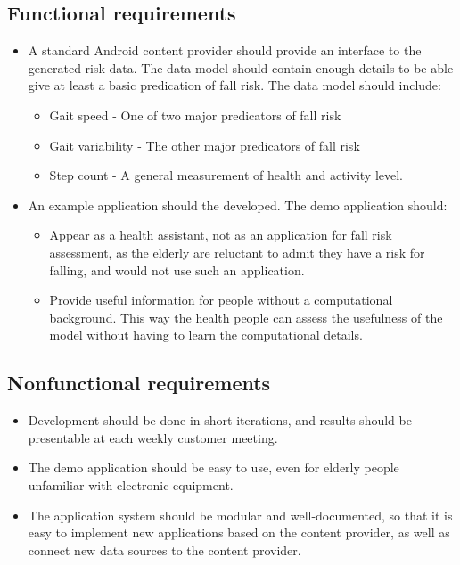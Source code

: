 \subsection{Functional requirements}
\begin{itemize}
\item A standard Android content provider should provide an interface to the generated risk data. The data model should contain enough details to be able give at least a basic predication of fall risk. The data model should include:
\begin{itemize}
\item Gait speed - One of two major predicators of fall risk
\item Gait variability - The other major predicators of fall risk
\item Step count - A general measurement of health and activity level.
\end{itemize}
\item An example application should the developed. The demo application should:
\begin{itemize}
\item Appear as a health assistant, not as an application for fall risk assessment, as the elderly are reluctant to admit they have a risk for falling, and would not use such an application.
\item Provide useful information for people without a computational background. This way the health people can assess the usefulness of the model without having to learn the computational details.
\end{itemize}	
\end{itemize}	

\subsection{Nonfunctional requirements}
\begin{itemize}
\item Development should be done in short iterations, and results should be presentable at each weekly customer meeting.
\item The demo application should be easy to use, even for elderly people unfamiliar with electronic equipment.
\item The application system should be modular and well-documented, so that it is easy to implement new applications based on the content provider, as well as connect new data sources to the content provider.
\end{itemize}	


